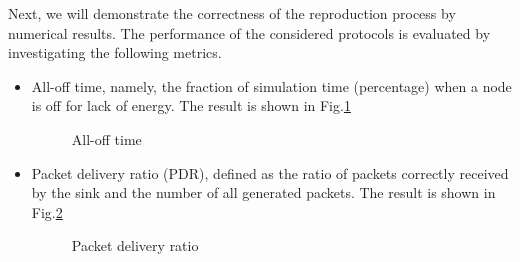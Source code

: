 \documentclass[10pt,twocolumn,letterpaper]{article}
\begin{document}
Next, we will demonstrate the correctness of the reproduction process by numerical results. The performance of the considered protocols is evaluated by investigating the following metrics.
\begin{itemize}
	\item All-off time, namely, the fraction of simulation time (percentage) when a node is off for lack of energy. The result is shown in Fig.\ref{fig:all-off}
	\begin{figure}[htbp]
		\centering
		\caption{All-off time}
		\label{fig:all-off}
	\end{figure}
	\item Packet delivery ratio (PDR), defined as the ratio of packets correctly received by the sink and the number of all generated packets. The result is shown in Fig.\ref{fig:PDR}
	\begin{figure}[htbp]
		\centering
		\caption{Packet delivery ratio}
		\label{fig:PDR}
	\end{figure}
\end{itemize}
\end{document}
